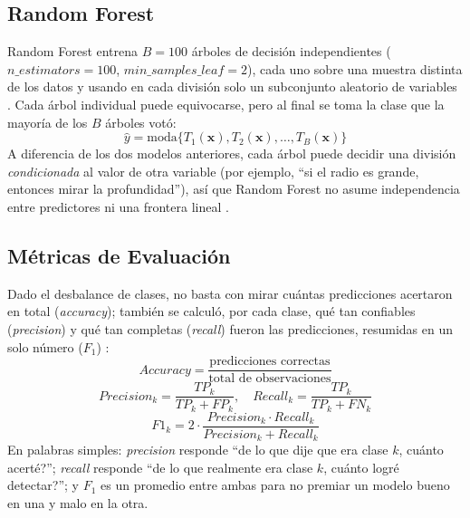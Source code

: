 \documentclass[10pt,journal]{IEEEtran}
\begin{document}
  \subsection{Random Forest}

  Random Forest entrena $B=100$ \'arboles de decisi\'on independientes ($n\_estimators=100$, $min\_samples\_leaf=2$), cada uno sobre una muestra distinta de los datos y usando en cada divisi\'on solo un subconjunto aleatorio de variables \cite{breiman2001}. Cada \'arbol individual puede equivocarse, pero al final se toma la clase que la mayor\'ia de los $B$ \'arboles vot\'o:
  \begin{equation}
    \hat{y} = \text{moda}\{T_1(\mathbf{x}), T_2(\mathbf{x}), \dots, T_B(\mathbf{x})\}
    \label{eq:vote}
  \end{equation}
  A diferencia de los dos modelos anteriores, cada \'arbol puede decidir una divisi\'on \emph{condicionada} al valor de otra variable (por ejemplo, ``si el radio es grande, entonces mirar la profundidad''), as\'i que Random Forest no asume independencia entre predictores ni una frontera lineal \cite{amat_rodrigo_2026}.

  \subsection{M\'etricas de Evaluaci\'on}

  Dado el desbalance de clases, no basta con mirar cu\'antas predicciones acertaron en total (\emph{accuracy}); tambi\'en se calcul\'o, por cada clase, qu\'e tan confiables (\emph{precision}) y qu\'e tan completas (\emph{recall}) fueron las predicciones, resumidas en un solo n\'umero ($F_1$) \cite{powers2011}:
  \begin{equation}
    Accuracy = \frac{\text{predicciones correctas}}{\text{total de observaciones}}
    \label{eq:acc}
  \end{equation}
  \begin{equation}
    Precision_k = \frac{TP_k}{TP_k + FP_k}, \quad
    Recall_k = \frac{TP_k}{TP_k + FN_k}
    \label{eq:precrec}
  \end{equation}
  \begin{equation}
    F1_k = 2 \cdot \frac{Precision_k \cdot Recall_k}{Precision_k + Recall_k}
    \label{eq:f1}
  \end{equation}
  En palabras simples: \emph{precision} responde ``de lo que dije que era clase $k$, \textquestiondown{}cu\'anto acert\'e?''; \emph{recall} responde ``de lo que realmente era clase $k$, \textquestiondown{}cu\'anto logr\'e detectar?''; y $F_1$ es un promedio entre ambas para no premiar un modelo bueno en una y malo en la otra.
\end{document}
